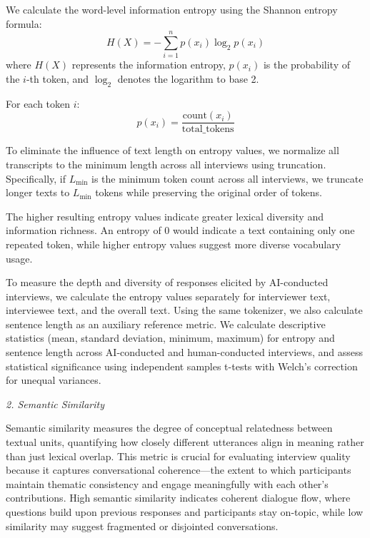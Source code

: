 \documentclass[sigchi,nonacm,manuscript]{acmart}
\begin{document}
We calculate the word-level information entropy using the Shannon entropy formula:
\begin{equation}
  H(X) = -\sum_{i=1}^{n} p(x_i) \log_2 p(x_i)
\end{equation}
where $H(X)$ represents the information entropy, $p(x_i)$ is the probability of the $i$-th token, and $\log_2$ denotes the logarithm to base 2.

For each token $i$:
\begin{equation}
  p(x_i) = \frac{\text{count}(x_i)}{\text{total\_tokens}}
\end{equation}

To eliminate the influence of text length on entropy values, we normalize all transcripts to the minimum length across all interviews using truncation. Specifically, if $L_{\min}$ is the minimum token count across all interviews, we truncate longer texts to $L_{\min}$ tokens while preserving the original order of tokens.

The higher resulting entropy values indicate greater lexical diversity and information richness. An entropy of 0 would indicate a text containing only one repeated token, while higher entropy values suggest more diverse vocabulary usage.

To measure the depth and diversity of responses elicited by AI-conducted interviews, we calculate the entropy values separately for interviewer text, interviewee text, and the overall text. Using the same tokenizer, we also calculate sentence length as an auxiliary reference metric. We calculate descriptive statistics (mean, standard deviation, minimum, maximum) for entropy and sentence length across AI-conducted and human-conducted interviews, and assess statistical significance using independent samples t-tests with Welch's correction for unequal variances.


\textit{2. Semantic Similarity}

Semantic similarity measures the degree of conceptual relatedness between textual units, quantifying how closely different utterances align in meaning rather than just lexical overlap. This metric is crucial for evaluating interview quality because it captures conversational coherence—the extent to which participants maintain thematic consistency and engage meaningfully with each other's contributions. High semantic similarity indicates coherent dialogue flow, where questions build upon previous responses and participants stay on-topic, while low similarity may suggest fragmented or disjointed conversations.
\end{document}
